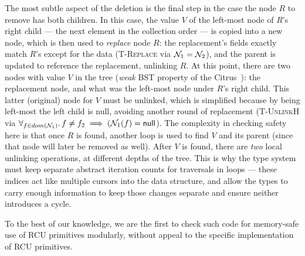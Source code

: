 The most subtle aspect of the deletion is the final step in the case the node $R$ to remove has both children.  In this case, the value $V$ of the left-most node of $R$'s right child --- the next element in the collection order --- is copied into a new node, which is then used to \emph{replace} node $R$: the replacement's fields exactly match $R$'s except for the data (\textsc{T-Replace} via $\mathcal{N}_1 = \mathcal{N}_2$), and the parent is updated to reference the replacement, unlinking $R$. At this point, there are two nodes with value $V$ in the tree (\textit{weak} BST property of the Citrus~\cite{Arbel:2014:CUR:2611462.2611471}): the replacement node, and what was the left-most node under $R$'s right child. This latter (original) node for $V$ must be unlinked, which is simplified because by being left-most the left child is null, avoiding another round of replacement (\textsc{T-UnlinkH} via $\forall_{f\in dom(\mathcal{N}_1)} \ldotp f\neq f_2 \implies (\mathcal{N}_1(f) = \textsf{null}$).
The complexity in checking safety here is that once $R$ is found, another loop is used to find $V$ and its parent (since that node will later be removed as well).
After $V$ is found, there are \emph{two} local unlinking operations, at different depths of the tree.  This is why the type system must keep separate abstract iteration counts for traversals in loops --- these indices act like multiple cursors into the data structure, and allow the types to carry enough information to keep those changes separate and ensure neither introduces a cycle.

To the best of our knowledge, we are the first to check such code for memory-safe use of RCU primitives modularly, without appeal to the specific implementation of RCU primitives.

